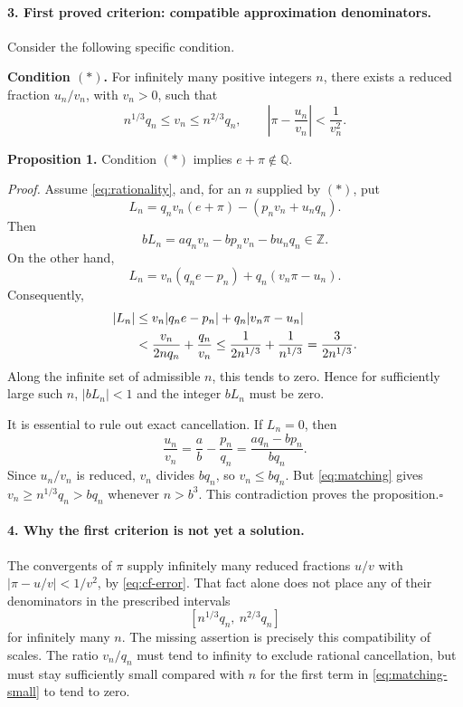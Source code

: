 \documentclass[11pt]{article}
\newcommand{\Q}{\mathbb Q}
\newcommand{\Z}{\mathbb Z}
\begin{document}
\paragraph{3. First proved criterion: compatible approximation denominators.}
Consider the following specific condition.

\textbf{Condition $(*)$.} For infinitely many positive integers $n$, there
exists a reduced fraction $u_n/v_n$, with $v_n>0$, such that
\begin{equation}\label{eq:matching}
 n^{1/3}q_n\le v_n\le n^{2/3}q_n,
 \qquad
 \left|\pi-\frac{u_n}{v_n}\right|<\frac1{v_n^2}.
\end{equation}

\textbf{Proposition 1.} Condition $(*)$ implies $e+\pi\notin\Q$.

\emph{Proof.} Assume \eqref{eq:rationality}, and, for an $n$ supplied by
$(*)$, put
\begin{equation}\label{eq:matching-form}
 L_n=q_nv_n(e+\pi)-(p_nv_n+u_nq_n).
\end{equation}
Then
\[
 bL_n=aq_nv_n-bp_nv_n-bu_nq_n\in\Z.
\]
On the other hand,
\[
 L_n=v_n(q_ne-p_n)+q_n(v_n\pi-u_n).
\]
Consequently,
\begin{align}
 |L_n|
 &\le v_n|q_ne-p_n|+q_n|v_n\pi-u_n|\notag\\
 &<\frac{v_n}{2nq_n}+\frac{q_n}{v_n}
 \le\frac1{2n^{1/3}}+\frac1{n^{1/3}}
 =\frac3{2n^{1/3}}.\label{eq:matching-small}
\end{align}
Along the infinite set of admissible $n$, this tends to zero. Hence for
sufficiently large such $n$, $|bL_n|<1$ and the integer $bL_n$ must be zero.

It is essential to rule out exact cancellation. If $L_n=0$, then
\[
 \frac{u_n}{v_n}=\frac ab-\frac{p_n}{q_n}
 =\frac{aq_n-bp_n}{bq_n}.
\]
Since $u_n/v_n$ is reduced, $v_n$ divides $bq_n$, so $v_n\le bq_n$.
But \eqref{eq:matching} gives $v_n\ge n^{1/3}q_n>bq_n$ whenever $n>b^3$.
This contradiction proves the proposition.\hfill$\square$

\paragraph{4. Why the first criterion is not yet a solution.}
The convergents of $\pi$ supply infinitely many reduced fractions $u/v$
with $|\pi-u/v|<1/v^2$, by \eqref{eq:cf-error}. That fact alone does not
place any of their denominators in the prescribed intervals
\[
 [n^{1/3}q_n,\ n^{2/3}q_n]
\]
for infinitely many $n$. The missing assertion is precisely this
compatibility of scales. The ratio $v_n/q_n$ must tend to infinity to
exclude rational cancellation, but must stay sufficiently small compared
with $n$ for the first term in \eqref{eq:matching-small} to tend to zero.
\end{document}
